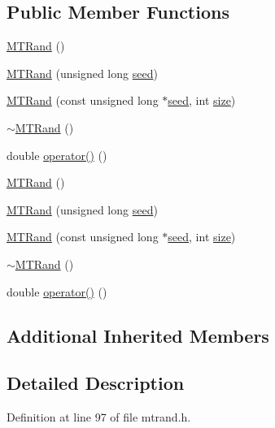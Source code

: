 \subsection*{Public Member Functions}
\begin{DoxyCompactItemize}
\item 
\hyperlink{a00015_a265dc65546e26073c0d5f8787b045a1d}{M\+T\+Rand} ()
\item 
\hyperlink{a00015_a2c88736896bcbdb54bcdd7a0026720d5}{M\+T\+Rand} (unsigned long \hyperlink{a00018_a0c57076fe30358e0700a7ce1baa0ea27}{seed})
\item 
\hyperlink{a00015_a6075a3beacdfb8e4cf48d9fb56cc193a}{M\+T\+Rand} (const unsigned long $\ast$\hyperlink{a00018_a0c57076fe30358e0700a7ce1baa0ea27}{seed}, int \hyperlink{a00104_ae113ea7f9e515a12ac4b5595c6faf61e}{size})
\item 
\hyperlink{a00015_a8c276546a41ae350dc9efc5e9c10a261}{$\sim$\+M\+T\+Rand} ()
\item 
double \hyperlink{a00015_abbb87a08d622d58fdee0eea4cb5471a0}{operator()} ()
\item 
\hyperlink{a00015_a265dc65546e26073c0d5f8787b045a1d}{M\+T\+Rand} ()
\item 
\hyperlink{a00015_a2c88736896bcbdb54bcdd7a0026720d5}{M\+T\+Rand} (unsigned long \hyperlink{a00018_a0c57076fe30358e0700a7ce1baa0ea27}{seed})
\item 
\hyperlink{a00015_a6075a3beacdfb8e4cf48d9fb56cc193a}{M\+T\+Rand} (const unsigned long $\ast$\hyperlink{a00018_a0c57076fe30358e0700a7ce1baa0ea27}{seed}, int \hyperlink{a00104_ae113ea7f9e515a12ac4b5595c6faf61e}{size})
\item 
\hyperlink{a00015_a8c276546a41ae350dc9efc5e9c10a261}{$\sim$\+M\+T\+Rand} ()
\item 
double \hyperlink{a00015_abbb87a08d622d58fdee0eea4cb5471a0}{operator()} ()
\end{DoxyCompactItemize}
\subsection*{Additional Inherited Members}


\subsection{Detailed Description}


Definition at line 97 of file mtrand.\+h.




